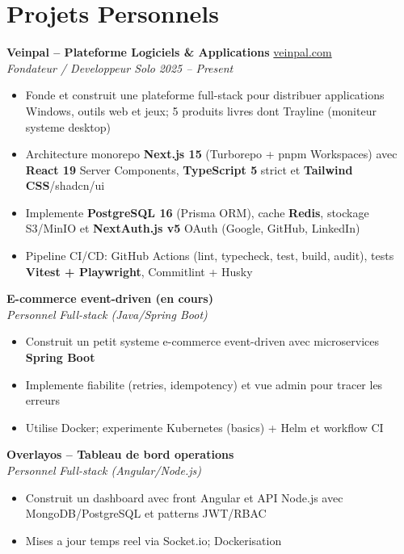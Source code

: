 \documentclass[10pt,a4paper]{article}
\begin{document}
\vspace{4pt}
\section*{Projets Personnels}
{\small
\textbf{Veinpal -- Plateforme Logiciels \& Applications} \hfill \href{https://veinpal.com}{veinpal.com}\\[1pt]
\textit{Fondateur / Developpeur Solo} \hfill \textit{2025 -- Present}
\begin{itemize}
  \item Fonde et construit une plateforme full-stack pour distribuer applications Windows, outils web et jeux; 5 produits livres dont Trayline (moniteur systeme desktop)
  \item Architecture monorepo \textbf{Next.js 15} (Turborepo + pnpm Workspaces) avec \textbf{React 19} Server Components, \textbf{TypeScript 5} strict et \textbf{Tailwind CSS}/shadcn/ui
  \item Implemente \textbf{PostgreSQL 16} (Prisma ORM), cache \textbf{Redis}, stockage S3/MinIO et \textbf{NextAuth.js v5} OAuth (Google, GitHub, LinkedIn)
  \item Pipeline CI/CD: GitHub Actions (lint, typecheck, test, build, audit), tests \textbf{Vitest + Playwright}, Commitlint + Husky
\end{itemize}

\vspace{2pt}
\textbf{E-commerce event-driven (en cours)}\\[1pt]
\textit{Personnel} \hfill \textit{Full-stack (Java/Spring Boot)}
\begin{itemize}
  \item Construit un petit systeme e-commerce event-driven avec microservices \textbf{Spring Boot}
  \item Implemente fiabilite (retries, idempotency) et vue admin pour tracer les erreurs
  \item Utilise Docker; experimente Kubernetes (basics) + Helm et workflow CI
\end{itemize}

\vspace{2pt}
\textbf{Overlayos -- Tableau de bord operations}\\[1pt]
\textit{Personnel} \hfill \textit{Full-stack (Angular/Node.js)}
\begin{itemize}
  \item Construit un dashboard avec front Angular et API Node.js avec MongoDB/PostgreSQL et patterns JWT/RBAC
  \item Mises a jour temps reel via Socket.io; Dockerisation
\end{itemize}
}
\end{document}
